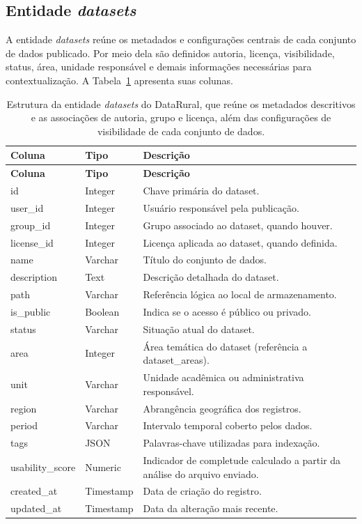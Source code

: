 \subsection{Entidade \textit{datasets}}

A entidade \textit{datasets} reúne os metadados e configurações centrais de cada conjunto de dados publicado. Por meio dela são definidos autoria, licença, visibilidade, status, área, unidade responsável e demais informações necessárias para contextualização. A Tabela~\ref{tab:entity_datasets} apresenta suas colunas.

\begin{longtable}{p{}p{}p{}}
\caption{Estrutura da entidade \textit{datasets} do DataRural, que reúne os metadados descritivos e as associações de autoria, grupo e licença, além das configurações de visibilidade de cada conjunto de dados.}\label{tab:entity_datasets}\\
\toprule
\textbf{Coluna} & \textbf{Tipo} & \textbf{Descrição} \\
\midrule
\endfirsthead
\toprule
\textbf{Coluna} & \textbf{Tipo} & \textbf{Descrição} \\
\midrule
\endhead
id & Integer & Chave primária do dataset. \\
user\_id & Integer & Usuário responsável pela publicação. \\
group\_id & Integer & Grupo associado ao dataset, quando houver. \\
license\_id & Integer & Licença aplicada ao dataset, quando definida. \\
name & Varchar & Título do conjunto de dados. \\
description & Text & Descrição detalhada do dataset. \\
path & Varchar & Referência lógica ao local de armazenamento. \\
is\_public & Boolean & Indica se o acesso é público ou privado. \\
status & Varchar & Situação atual do dataset. \\
area & Integer & Área temática do dataset (referência a dataset\_areas). \\
unit & Varchar & Unidade acadêmica ou administrativa responsável. \\
region & Varchar & Abrangência geográfica dos registros. \\
period & Varchar & Intervalo temporal coberto pelos dados. \\
tags & JSON & Palavras-chave utilizadas para indexação. \\
usability\_score & Numeric & Indicador de completude calculado a partir da análise do arquivo enviado. \\
created\_at & Timestamp & Data de criação do registro. \\
updated\_at & Timestamp & Data da alteração mais recente. \\
\bottomrule
\end{longtable}

